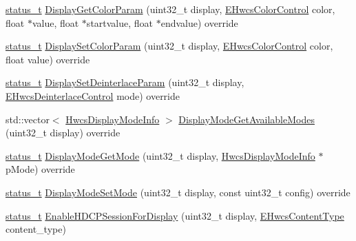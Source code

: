 \begin{DoxyCompactItemize}
\item 
\mbox{\hyperlink{hwcserviceapi_8h_a3806fb2027d9a316d8ca8d9b8b8eb96f}{status\+\_\+t}} \mbox{\hyperlink{classhwcomposer_1_1BpControls_a9946715d7fa9454b859013dff01b0576}{Display\+Get\+Color\+Param}} (uint32\+\_\+t display, \mbox{\hyperlink{hwcserviceapi_8h_a1d1cbf448ce748672cf3dd96675d70e4}{E\+Hwcs\+Color\+Control}} color, float $\ast$value, float $\ast$startvalue, float $\ast$endvalue) override
\item 
\mbox{\hyperlink{hwcserviceapi_8h_a3806fb2027d9a316d8ca8d9b8b8eb96f}{status\+\_\+t}} \mbox{\hyperlink{classhwcomposer_1_1BpControls_a511db753c15bac20e7390f034b454065}{Display\+Set\+Color\+Param}} (uint32\+\_\+t display, \mbox{\hyperlink{hwcserviceapi_8h_a1d1cbf448ce748672cf3dd96675d70e4}{E\+Hwcs\+Color\+Control}} color, float value) override
\item 
\mbox{\hyperlink{hwcserviceapi_8h_a3806fb2027d9a316d8ca8d9b8b8eb96f}{status\+\_\+t}} \mbox{\hyperlink{classhwcomposer_1_1BpControls_ab21dbe5b9f8e5979685083f294631c5e}{Display\+Set\+Deinterlace\+Param}} (uint32\+\_\+t display, \mbox{\hyperlink{hwcserviceapi_8h_a8473f2ec9e7333e67be46a1bea689113}{E\+Hwcs\+Deinterlace\+Control}} mode) override
\item 
std\+::vector$<$ \mbox{\hyperlink{hwcserviceapi_8h_a6e13f5285374b86aab82ec0c0ba62d7a}{Hwcs\+Display\+Mode\+Info}} $>$ \mbox{\hyperlink{classhwcomposer_1_1BpControls_aa5169400479ae6bda2d2fc3168a521f2}{Display\+Mode\+Get\+Available\+Modes}} (uint32\+\_\+t display) override
\item 
\mbox{\hyperlink{hwcserviceapi_8h_a3806fb2027d9a316d8ca8d9b8b8eb96f}{status\+\_\+t}} \mbox{\hyperlink{classhwcomposer_1_1BpControls_a28f71e7f95593a9e9302d260dba810fa}{Display\+Mode\+Get\+Mode}} (uint32\+\_\+t display, \mbox{\hyperlink{hwcserviceapi_8h_a6e13f5285374b86aab82ec0c0ba62d7a}{Hwcs\+Display\+Mode\+Info}} $\ast$p\+Mode) override
\item 
\mbox{\hyperlink{hwcserviceapi_8h_a3806fb2027d9a316d8ca8d9b8b8eb96f}{status\+\_\+t}} \mbox{\hyperlink{classhwcomposer_1_1BpControls_a1bb5b34015941a5d5d76cdc57a889110}{Display\+Mode\+Set\+Mode}} (uint32\+\_\+t display, const uint32\+\_\+t config) override
\item 
\mbox{\hyperlink{hwcserviceapi_8h_a3806fb2027d9a316d8ca8d9b8b8eb96f}{status\+\_\+t}} \mbox{\hyperlink{classhwcomposer_1_1BpControls_a38c36098ef3251a0c396530b9c33c3e4}{Enable\+H\+D\+C\+P\+Session\+For\+Display}} (uint32\+\_\+t display, \mbox{\hyperlink{hwcserviceapi_8h_a69e9b3a54e4c8e504845398c66eab655}{E\+Hwcs\+Content\+Type}} content\+\_\+type)

\end{DoxyCompactItemize}
